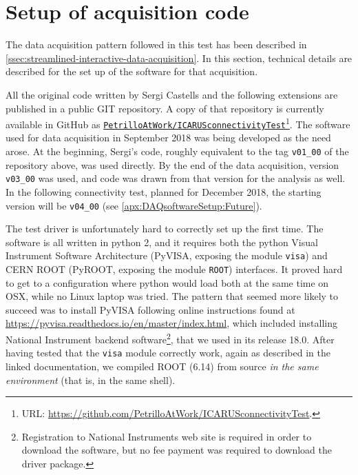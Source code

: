 \section{Setup of acquisition code}
\label{app:DAQsoftwareSetup}

The data acquisition pattern followed in this test has been described in
\cref{ssec:streamlined-interactive-data-acquisition}.
In this section, technical details are described for the set up of the software
for that acquisition.

All the original code written by Sergi Castells and the following extensions are
published in a public GIT repository. A copy of that repository is currently
available in GitHub as
\href{https://github.com/PetrilloAtWork/ICARUSconnectivityTest}{\texttt{PetrilloAtWork/ICARUSconnectivityTest}}\footnote{%
URL: \url{https://github.com/PetrilloAtWork/ICARUSconnectivityTest}.}.
The software used for data acquisition in September 2018 was being developed as
the need arose. At the beginning, Sergi's code, roughly equivalent to the tag
\texttt{v01\_00} of the repository above, was used
directly. By the end of the data acquisition, version \texttt{v03\_00} was used,
and code was drawn from that version for the analysis as well.
In the following connectivity test, planned for December 2018, the starting
version will be \texttt{v04\_00} (see \cref{apx:DAQsoftwareSetup:Future}).

The test driver is unfortunately hard to correctly set up the first time.
The software is all written in python 2, and it requires both the python
Visual Instrument Software Architecture (PyVISA, exposing the module
\texttt{visa}) and CERN ROOT (PyROOT, exposing the module \texttt{ROOT})
interfaces. It proved hard to get to a configuration where python would
load both at the same time on OSX, while no Linux laptop was tried. The
pattern that seemed more likely to succeed was to install PyVISA
following online instructions found at
\url{https://pyvisa.readthedocs.io/en/master/index.html}, which
included installing National Instrument backend software\footnote{%
Registration to National Instruments web site is required in
order to download the software, but no fee payment was required to
download the driver package.
}, that we used in its release 18.0. After having tested that the \texttt{visa}
module correctly work, again as described in the linked documentation,
we compiled ROOT (6.14) from source \emph{in the same environment} (that
is, in the same shell).

